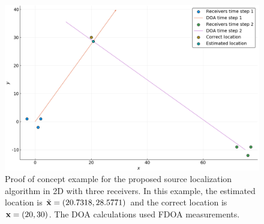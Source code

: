 \begin{center}
  \begin{figure}[H]
    \includegraphics[scale=0.5]{DOA_proofofconcept}
    \caption{Proof of concept example for the proposed source localization algorithm in 2D with three receivers. In this example, the estimated location is $\tilde{\mathbf{x}} = (20.7318,28.5771)$ and the correct location is $\mathbf{x} = (20,30)$. The DOA calculations used FDOA measurements.}
    \label{fig:doa}
  \end{figure}
\end{center}

